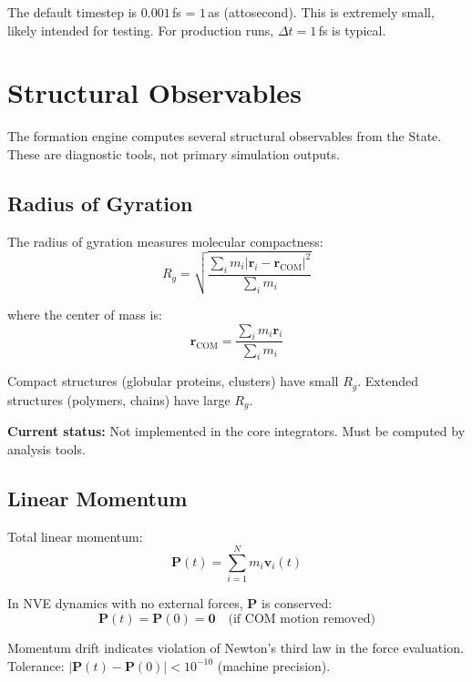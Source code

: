\documentclass[11pt]{article}
\begin{document}
The default timestep is $0.001$\,fs = $1$\,as (attosecond). This is extremely small, likely intended for testing. For production runs, $\Delta t = 1$\,fs is typical.

\section{Structural Observables}

The formation engine computes several structural observables from the State. These are diagnostic tools, not primary simulation outputs.

\subsection{Radius of Gyration}

The radius of gyration measures molecular compactness:
\begin{equation}
R_g = \sqrt{\frac{\sum_i m_i |\mathbf{r}_i - \mathbf{r}_{\text{COM}}|^2}{\sum_i m_i}}
\end{equation}

where the center of mass is:
\begin{equation}
\mathbf{r}_{\text{COM}} = \frac{\sum_i m_i \mathbf{r}_i}{\sum_i m_i}
\end{equation}

Compact structures (globular proteins, clusters) have small $R_g$. Extended structures (polymers, chains) have large $R_g$.

\textbf{Current status:} Not implemented in the core integrators. Must be computed by analysis tools.

\subsection{Linear Momentum}

Total linear momentum:
\begin{equation}
\mathbf{P}(t) = \sum_{i=1}^{N} m_i \mathbf{v}_i(t)
\end{equation}

In NVE dynamics with no external forces, $\mathbf{P}$ is conserved:
\begin{equation}
\mathbf{P}(t) = \mathbf{P}(0) = \mathbf{0} \quad \text{(if COM motion removed)}
\end{equation}

Momentum drift indicates violation of Newton's third law in the force evaluation. Tolerance: $|\mathbf{P}(t) - \mathbf{P}(0)| < 10^{-10}$ (machine precision).
\end{document}
